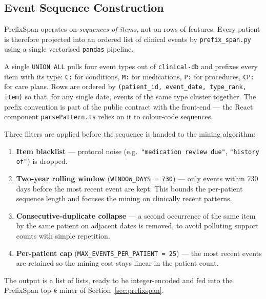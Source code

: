 \subsection{Event Sequence Construction}

PrefixSpan operates on \emph{sequences of items}, not on rows of features. Every patient is therefore projected into an ordered list of clinical events by \texttt{prefix\_span.py} using a single vectorised \texttt{pandas} pipeline.

A single \texttt{UNION ALL} pulls four event types out of \texttt{clinical-db} and prefixes every item with its type: \texttt{C:} for conditions, \texttt{M:} for medications, \texttt{P:} for procedures, \texttt{CP:} for care plans. Rows are ordered by \texttt{(patient\_id, event\_date, type\_rank, item)} so that, for any single date, events of the same type cluster together. The prefix convention is part of the public contract with the front-end --- the React component \texttt{parsePattern.ts} relies on it to colour-code sequences.

Three filters are applied before the sequence is handed to the mining algorithm:
\begin{enumerate}
    \item \textbf{Item blacklist} --- protocol noise (e.g.\ \texttt{"medication review due"}, \texttt{"history of"}) is dropped.
    \item \textbf{Two-year rolling window} (\texttt{WINDOW\_DAYS = 730}) --- only events within 730 days before the most recent event are kept. This bounds the per-patient sequence length and focuses the mining on clinically recent patterns.
    \item \textbf{Consecutive-duplicate collapse} --- a second occurrence of the same item by the same patient on adjacent dates is removed, to avoid polluting support counts with simple repetition.
    \item \textbf{Per-patient cap} (\texttt{MAX\_EVENTS\_PER\_PATIENT = 25}) --- the most recent events are retained so the mining cost stays linear in the patient count.
\end{enumerate}

The output is a list of lists, ready to be integer-encoded and fed into the PrefixSpan top-$k$ miner of Section~\ref{sec:prefixspan}.
